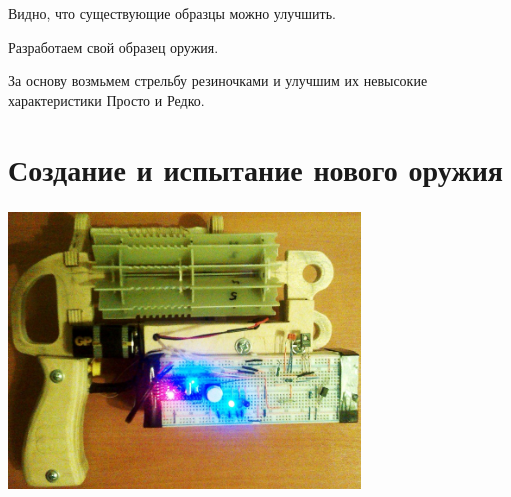 \begin{frame}
    \begin{center}
        Видно, что существующие образцы можно улучшить. 
        
        \par\bigskip
        
        Разработаем свой образец оружия.
        
        \par\bigskip

        За основу возмьмем стрельбу резиночками и улучшим их невысокие характеристики \alert{Просто} и \alert{Редко}.
    \end{center}
\end{frame}


\section{Создание и испытание нового оружия}

\begin{frame}
    \frametitle{\myDevice}
    
    \begin{center}
        \includegraphics[width=0.7\textwidth]{fig/device}
    \end{center}
\end{frame}


